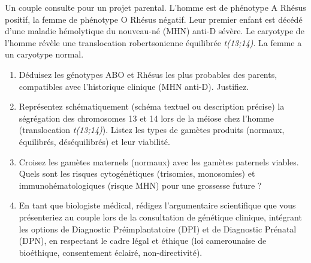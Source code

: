 \documentclass[11pt]{article}
\begin{document}
\begin{exercice}
Un couple consulte pour un projet parental. L'homme est de phénotype A Rhésus positif, la femme de phénotype O Rhésus négatif. Leur premier enfant est décédé d'une maladie hémolytique du nouveau-né (MHN) anti-D sévère. Le caryotype de l'homme révèle une translocation robertsonienne équilibrée \textit{t(13;14)}. La femme a un caryotype normal.

\begin{enumerate}
    \item Déduisez les génotypes ABO et Rhésus les plus probables des parents, compatibles avec l'historique clinique (MHN anti-D). Justifiez.
    \item Représentez schématiquement (schéma textuel ou description précise) la ségrégation des chromosomes 13 et 14 lors de la méiose chez l'homme (translocation \textit{t(13;14)}). Listez les types de gamètes produits (normaux, équilibrés, déséquilibrés) et leur viabilité.
    \item Croisez les gamètes maternels (normaux) avec les gamètes paternels viables. Quels sont les risques cytogénétiques (trisomies, monosomies) et immunohématologiques (risque MHN) pour une grossesse future ?
    \item En tant que biologiste médical, rédigez l'argumentaire scientifique que vous présenteriez au couple lors de la consultation de génétique clinique, intégrant les options de Diagnostic Préimplantatoire (DPI) et de Diagnostic Prénatal (DPN), en respectant le cadre légal et éthique (loi camerounaise de bioéthique, consentement éclairé, non-directivité).
\end{enumerate}
\end{exercice}
\end{document}
